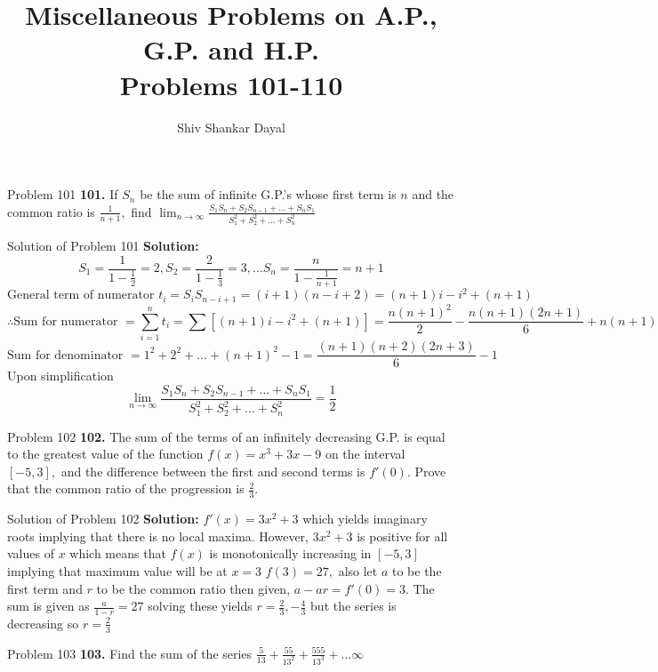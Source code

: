 \documentclass[aspectratio=1610,8pt]{beamer}
\title{Miscellaneous Problems on A.P., G.P. and H.P.\\Problems 101-110}
\author[Shiv Shankar Dayal]{Shiv Shankar Dayal}
\begin{document}
\begin{frame}
  \titlepage
\end{frame}
\begin{frame}{Problem 101}
  \textbf{101.} If $S_n$ be the sum of infinite G.P.'s whose first term is $n$ and the common ratio is $\frac{1}{n + 1},$ find
  $\lim_{n\to \infty} \frac{S_1S_n + S_2S_{n - 1} + \ldots + S_nS_1}{S_1^2 + S_2^2 + \ldots + S_n^2}$
\end{frame}
\begin{frame}{Solution of Problem 101}
  \textbf{Solution:} $$S_1 = \frac{1}{1 - \frac{1}{2}} = 2, S_2 = \frac{2}{1 - \frac{1}{3}} = 3,\ldots S_n = \frac{n}{1 -
    \frac{1}{n + 1}} = n + 1$$
  $$\text{General term of numerator~}t_i = S_iS_{n - i + 1} = (i + 1)(n - i + 2) = (n + 1)i - i^2 + (n + 1)$$
  $$\therefore \text{Sum for numerator~} = \sum_{i=1}^nt_i = \sum[(n + 1)i - i^2 + (n + 1)] = \frac{n(n + 1)^2}{2} - \frac{n(n + 1)(2n
    + 1)}{6} + n(n + 1)$$
  $$\text{Sum for denominator~}= 1^2 + 2^2 + \ldots + (n + 1)^2 - 1 = \frac{(n + 1)(n + 2)(2n + 3)}{6} - 1$$
  Upon simplification $$\lim_{n\to \infty} \frac{S_1S_n + S_2S_{n - 1} + \ldots + S_nS_1}{S_1^2 + S_2^2 + \ldots + S_n^2} = \frac{1}{2}$$
\end{frame}
\begin{frame}{Problem 102}
  \textbf{102.} The sum of the terms of an infinitely decreasing G.P. is equal to the greatest value of the function $f(x) = x^3 +
  3x - 9$ on the interval $[-5, 3],$ and the difference between the first and second terms is $f'(0).$ Prove that the common ratio
  of the progression is $\frac{2}{3}.$
\end{frame}
\begin{frame}{Solution of Problem 102}
  \textbf{Solution:} $f'(x) = 3x^2 + 3$ which yields imaginary roots implying that there is no local maxima. However, $3x^2 + 3$ is
  positive for all values of $x$ which means that $f(x)$ is monotonically increasing in $[-5, 3]$ implying that maximum value will
  be at $x = 3$
  \linebreak\linebreak
  $f(3) = 27,$ also let $a$ to be the first term and $r$ to be the common ratio then given, $a - ar = f'(0) = 3.$ The sum is given
  as $\frac{a}{1 - r} = 27$ solving these yields $r = \frac{2}{3}, -\frac{4}{3}$ but the series is decreasing so $r = \frac{2}{3}$
\end{frame}
\begin{frame}{Problem 103}
  \textbf{103.} Find the sum of the series $\frac{5}{13} + \frac{55}{13^2} + \frac{555}{13^3} + \ldots \infty$
\end{frame}
\end{document}

